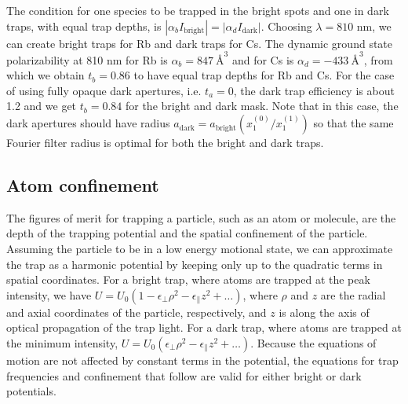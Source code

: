 The condition for one species to be trapped in the bright spots and one in dark traps, with equal trap depths, is  $\left|\alpha_b I_{\text {bright}}\right| = \left|\alpha_d I_{\text {dark}}\right|$. Choosing $\lambda=810$ nm, we can create bright traps for Rb and dark traps for Cs. The dynamic ground state polarizability at 810 nm for Rb is 
$\alpha_b = 847~ \textrm{\AA}^{3}$ and for Cs is $\alpha_d = -433~ \textrm{\AA}^{3}$, from which we obtain $t_b= 0.86$ to have equal trap depths for Rb and Cs. For the case of using fully opaque dark apertures, i.e. $t_a=0$, the dark trap efficiency is about 1.2 and we get $t_b=0.84$ for the bright and dark mask. Note that in this case, the dark apertures should have radius $a_{\textrm{dark}} = a_{\textrm{bright}} (x_1^{(0)}/x_1^{(1)})$ so that the same Fourier filter radius is optimal for both the bright and dark traps.

\subsection{Atom confinement}\label{sub:confine}

The figures of merit for trapping a particle, such as an atom or molecule, are the depth of the trapping potential and the spatial confinement of the particle. Assuming the particle to be in a low energy motional state, we can approximate the trap as a harmonic potential by keeping only up to the quadratic terms in spatial coordinates. For a bright trap, where atoms are trapped at the peak intensity, we have $U=U_{0}\left(1-\epsilon_{\perp} \rho^{2}-\epsilon_{\|} z^{2}+\ldots\right)$, where $\rho$ and $z$ are the radial and axial coordinates of the particle, respectively, and $z$ is along the axis of optical propagation of the trap light. For a dark trap, where atoms are trapped at the minimum intensity, $U=U_{0}\left(\epsilon_{\perp} \rho^{2}-\epsilon_{\|} z^{2}+\ldots\right)$. Because the equations of motion are not affected by constant terms in the potential, the equations for trap frequencies and confinement that follow are valid for either bright or dark potentials.

